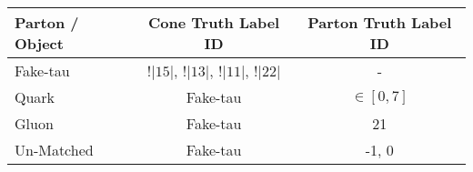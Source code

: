 %
\begin{tabular}{lcc} \hline
Parton / Object & Cone Truth Label ID & Parton Truth Label ID \\ \hline \hline
Fake-tau & !$|15|$, !$|13|$, !$|11|$, !$|22|$ & - \\
Quark & Fake-tau & $\in[0,7]$ \\
Gluon & Fake-tau & 21 \\
Un-Matched & Fake-tau & -1, 0 \\ \hline
\end{tabular}
%
%